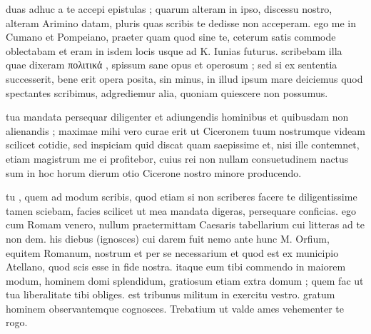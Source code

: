 


 duas adhuc a te accepi epistulas ; quarum alteram in ipso, discessu nostro, alteram Arimino datam, pluris quas scribis te dedisse non acceperam. ego me in Cumano et Pompeiano, praeter quam quod sine te, ceterum satis commode oblectabam et eram in isdem locis usque ad K. Iunias futurus. scribebam illa quae dixeram πολιτικά , spissum sane opus et operosum ; sed si ex sententia successerit, bene erit opera posita, sin minus, in illud ipsum mare deiciemus quod spectantes scribimus, adgrediemur alia, quoniam quiescere non possumus.

 tua mandata persequar diligenter et adiungendis hominibus et quibusdam non alienandis ; maximae mihi vero curae erit ut Ciceronem tuum nostrumque videam scilicet cotidie, sed inspiciam quid discat quam saepissime et, nisi ille contemnet, etiam magistrum me ei profitebor, cuius rei non nullam consuetudinem nactus sum in hoc horum dierum otio Cicerone nostro minore producendo.

 tu , quem ad modum scribis, quod etiam si non scriberes facere te diligentissime tamen sciebam, facies scilicet ut mea mandata digeras, persequare conficias. ego cum Romam venero, nullum praetermittam Caesaris tabellarium cui litteras ad te non dem. his diebus (ignosces) cui darem fuit nemo ante hunc M. Orfium, equitem Romanum, nostrum et per se necessarium et quod est ex municipio Atellano, quod scis esse in fide nostra. itaque eum tibi commendo in maiorem modum, hominem domi splendidum, gratiosum etiam extra domum ; quem fac ut tua liberalitate tibi obliges. est tribunus militum in exercitu vestro. gratum hominem observantemque cognosces. Trebatium ut valde ames vehementer te rogo.
